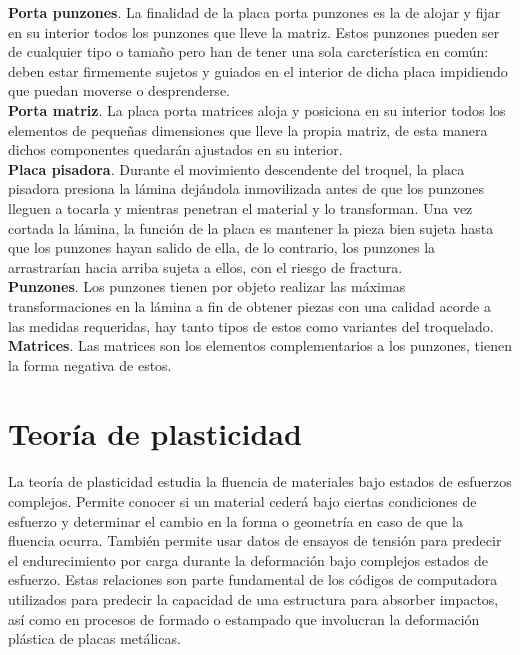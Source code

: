 \textbf{Porta punzones}. La finalidad de la placa porta punzones es la de alojar y fijar en 
su interior todos los punzones que lleve la matriz. Estos punzones pueden ser de cualquier 
tipo o tamaño pero han de tener una sola carcterística en común: deben estar firmemente 
sujetos y guiados en el interior de dicha placa impidiendo que puedan moverse o desprenderse.\\

\textbf{Porta matriz}. La placa porta matrices aloja y posiciona en su interior todos 
los elementos de pequeñas dimensiones que lleve la propia matriz, de esta manera dichos componentes 
quedarán ajustados en su interior.\\

\textbf{Placa pisadora}. Durante el movimiento descendente del troquel, la placa pisadora presiona 
la lámina dejándola inmovilizada antes de que los punzones lleguen a tocarla y mientras penetran 
el material y lo transforman. Una vez cortada la lámina, la función de la placa es mantener la 
pieza bien sujeta hasta que los punzones hayan salido de ella, de lo contrario, los punzones 
la arrastrarían hacia arriba sujeta a ellos, con el riesgo de fractura.\\

\textbf{Punzones}. Los punzones tienen por objeto realizar las máximas transformaciones en la lámina 
a fin de obtener piezas con una calidad acorde a las medidas requeridas, hay tanto tipos de estos 
como variantes del troquelado.\\

\textbf{Matrices}. Las matrices son los elementos complementarios a los punzones, tienen la forma 
negativa de estos.


\section{Teoría de plasticidad}

La teoría de plasticidad estudia la fluencia de materiales bajo estados de esfuerzos complejos. Permite 
conocer si un material cederá bajo ciertas condiciones de esfuerzo y determinar el cambio en la forma o 
geometría en caso de que la fluencia ocurra. También permite usar datos de ensayos de tensión para predecir 
el endurecimiento por carga durante la deformación bajo complejos estados de esfuerzo. Estas relaciones 
son parte fundamental de los códigos de computadora utilizados para predecir la capacidad de una estructura 
para absorber impactos, así como en procesos de formado o estampado que involucran la deformación plástica de 
placas metálicas. ~\cite{hosford2005}


